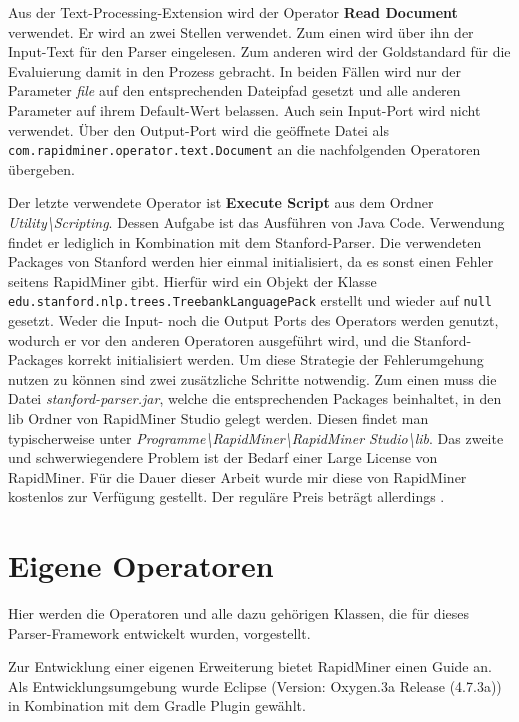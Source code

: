 Aus der Text-Processing-Extension wird der Operator \textbf{Read Document} verwendet. Er wird an zwei Stellen verwendet. Zum einen wird über ihn der Input-Text für den Parser eingelesen. Zum anderen wird der Goldstandard für die Evaluierung damit in den Prozess gebracht. In beiden Fällen wird nur der Parameter \textit{file} auf den entsprechenden Dateipfad gesetzt und alle anderen Parameter auf ihrem Default-Wert belassen. Auch sein Input-Port wird nicht verwendet. Über den Output-Port wird die geöffnete Datei als \texttt{com.rapidminer.operator.text.Document} an die nachfolgenden Operatoren übergeben.

Der letzte verwendete Operator ist \textbf{Execute Script} aus dem Ordner \textit{Utility\textbackslash Scripting}. Dessen Aufgabe ist das Ausführen von Java Code. Verwendung findet er lediglich in Kombination mit dem Stanford-Parser. Die verwendeten Packages von Stanford werden hier einmal initialisiert, da es sonst einen Fehler seitens RapidMiner gibt. Hierfür wird ein Objekt der Klasse  \texttt{edu.stanford.nlp.trees.TreebankLanguagePack} erstellt und wieder auf \texttt{null} gesetzt. Weder die Input- noch die Output Ports des Operators werden genutzt, wodurch er vor den anderen Operatoren ausgeführt wird, und die Stanford-Packages korrekt initialisiert werden. Um diese Strategie der Fehlerumgehung nutzen zu können sind zwei zusätzliche Schritte notwendig. Zum einen muss die Datei \textit{stanford-parser.jar}, welche die entsprechenden Packages beinhaltet, in den lib Ordner von RapidMiner Studio gelegt werden. Diesen findet man typischerweise unter \textit{Programme\textbackslash RapidMiner\textbackslash RapidMiner Studio\textbackslash  lib}. Das zweite und schwerwiegendere Problem ist der Bedarf einer Large License von RapidMiner. Für die Dauer dieser Arbeit wurde mir diese von RapidMiner kostenlos zur Verfügung gestellt. Der reguläre Preis beträgt allerdings %
.

\section{Eigene Operatoren}
\label{sec:impl:eigene}

Hier werden die Operatoren und alle dazu gehörigen Klassen, die für dieses Parser-Framework entwickelt wurden, vorgestellt. 

Zur Entwicklung einer eigenen Erweiterung bietet RapidMiner einen Guide an. %
Als Entwicklungsumgebung wurde Eclipse (Version: Oxygen.3a Release (4.7.3a)) in Kombination mit dem Gradle Plugin  gewählt. 

